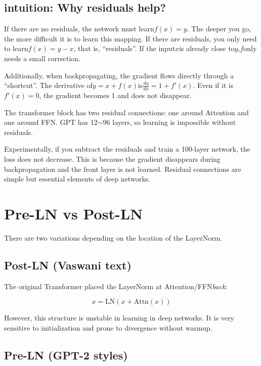 \subsection{intuition: Why residuals help?}

If there are no residuals, the network must learn$f(x) = y$. The deeper you go, the more difficult it is to learn this mapping. If there are residuals, you only need to learn$f(x) = y - x$, that is, ``residuals''. If the input$x$is already close to$y$,$f$only needs a small correction.

Additionally, when backpropagating, the gradient flows directly through a ``shortcut''.  The derivative of$y = x + f(x)$is$\frac{dy}{dx} = 1 + f'(x)$.  Even if it is$f'(x) = 0$, the gradient becomes 1 and does not disappear.

The transformer block has two residual connections: one around Attention and one around FFN. GPT has 12$\sim$96 layers, so learning is impossible without residuals.

\begin{warnbox}
Experimentally, if you subtract the residuals and train a 100-layer network, the loss does not decrease. This is because the gradient disappears during backpropagation and the front layer is not learned. Residual connections are simple but essential elements of deep networks.
\end{warnbox}

\section{Pre-LN vs Post-LN}

There are two variations depending on the location of the LayerNorm.

\subsection{Post-LN (Vaswani text)}

The original Transformer placed the LayerNorm at Attention/FFN\emph{back}:

\[
x = \text{LN}(x + \text{Attn}(x))
\]

However, this structure is unstable in learning in deep networks. It is very sensitive to initialization and prone to divergence without warmup.

\subsection{Pre-LN (GPT-2 styles)}


